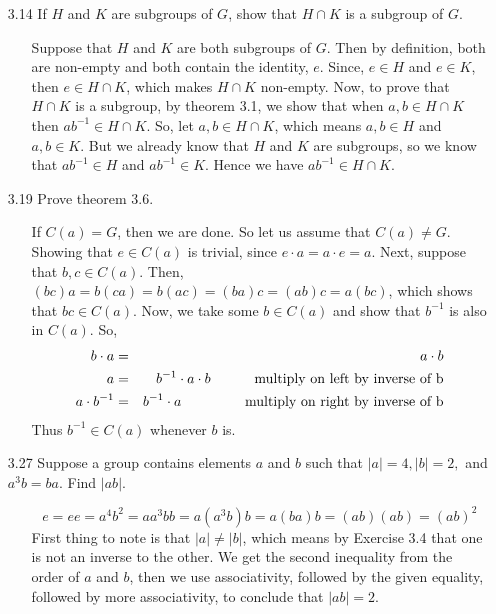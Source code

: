 \documentclass[12pt]{article}
\begin{document}
\begin{enumerate}
\item[3.14] If $H$ and $K$ are subgroups of $G$, show that $H \cap K$ is a subgroup of $G$.
\begin{enumerate}
\item[] Suppose that $H$ and $K$ are both subgroups of $G$. Then by definition, both
are non-empty and both contain the identity, $e$. Since, $e \in H$ and $e \in K$, then
$e \in H \cap K$, which makes $H \cap K$ non-empty. Now, to prove that $H \cap K$ is a 
subgroup, by theorem 3.1, we show that when $a, b \in H \cap K$ then $ab^{-1} \in H \cap K$.
So, let $a, b \in H \cap K$, which means $a, b \in H$ and $a, b \in K$. But we already know
that $H$ and $K$ are subgroups, so we know that $ab^{-1} \in H$ and $ab^{-1} \in K$. Hence
we have $ab^{-1} \in H \cap K$.
\end{enumerate}

\item[3.19] Prove theorem 3.6.
\begin{enumerate}
\item[] If $C(a) = G$, then we are done. So let us assume that $C(a) \neq G$. Showing
that $e \in C(a)$ is trivial, since $e \cdot a = a \cdot e = a$. Next, suppose that
$b, c \in C(a)$. Then, $(bc)a = b(ca) = b(ac) = (ba)c = (ab)c = a(bc)$, which shows
that $bc \in C(a)$.
Now, we take some 
$b \in C(a)$ and show that $b^{-1}$ is also in $C(a)$. So, 
\begin{eqnarray*}
b \cdot a &=& a \cdot b \\
a &=& b^{-1} \cdot a \cdot b \hskip 1.1cm \mbox{multiply on left by inverse of b}\\
a \cdot b^{-1} &=& b^{-1} \cdot a \hskip 1.6cm \mbox{multiply on right by inverse of b}
\end{eqnarray*}
Thus $b^{-1} \in C(a)$ whenever $b$ is.
\end{enumerate}

\item[3.27] Suppose a group contains elements $a$ and $b$ such that $|a| = 4, |b| = 2,$ and
$a^3b = ba$. Find $|ab|$.
\begin{enumerate}
\item[] 
\[
e = ee = a^4b^2 = aa^3bb = a(a^3b)b = a(ba)b = (ab)(ab) = (ab)^2
\]
First thing to note is that $|a| \neq |b|$, which means by Exercise 3.4
that one is not an inverse to the other. We get the second inequality from the order of $a$
and $b$, then we use associativity, followed by the given equality, followed by more 
associativity, to conclude that $|ab| = 2$.
\end{enumerate}


\end{enumerate}
\end{document}
